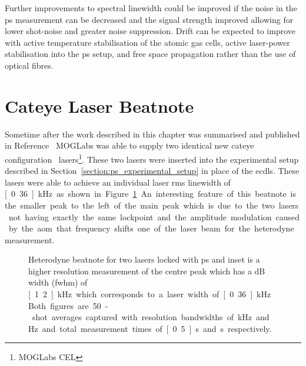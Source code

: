 Further improvements to spectral linewidth could be improved if the noise in the \gls{ps} measurement can be decreased and the signal strength improved allowing for lower shot-noise and greater noise suppression.
Drift can be expected to improve with active temperature stabilisation of the atomic gas cells, active laser-power stabilisation into the \gls{ps} setup, and free space propagation rather than the use of optical fibres.

\section{Cateye Laser Beatnote}

Sometime after the work described in this chapter was summarised and published in Reference~\cite{torrance_sub-kilohertz_2016} MOGLabs was able to supply two identical new cateye configuration~\cite{thompson_narrow_2012} lasers\footnote{MOGLabs CEL}.
These two lasers were inserted into the experimental setup described in Section~\ref{section:ps_experimental_setup} in place of the \glspl{ecdl}.
These lasers were able to achieve an individual laser \gls{rms} linewidth of \unit[0.36]{kHz} as shown in Figure~\ref{figure:cateye_beatnote}.
An interesting feature of this beatnote is the smaller peak to the left of the main peak which is due to the two lasers not having exactly the same lockpoint and the amplitude modulation caused by the \gls{aom} that frequency shifts one of the laser beam for the heterodyne measurement.

\begin{figure}
\center

\caption[Heterodyne beatnote for two cateye lasers locked with high-bandwidth polarisation spectroscopy.]{Heterodyne beatnote for two lasers locked with \gls{ps} and inset is a higher resolution measurement of the centre peak which has a \unit[-3]{dB} width (\gls{fwhm}) of \unit[1.2]{kHz} which corresponds to a laser width of \unit[0.36]{kHz}.
Both figures are 50-shot averages captured with resolution bandwidths of \unit[30]{kHz} and \unit[100]{Hz} and total measurement times of \unit[0.5]{s} and \unit[2]{s} respectively.}
\label{figure:cateye_beatnote}
\end{figure}